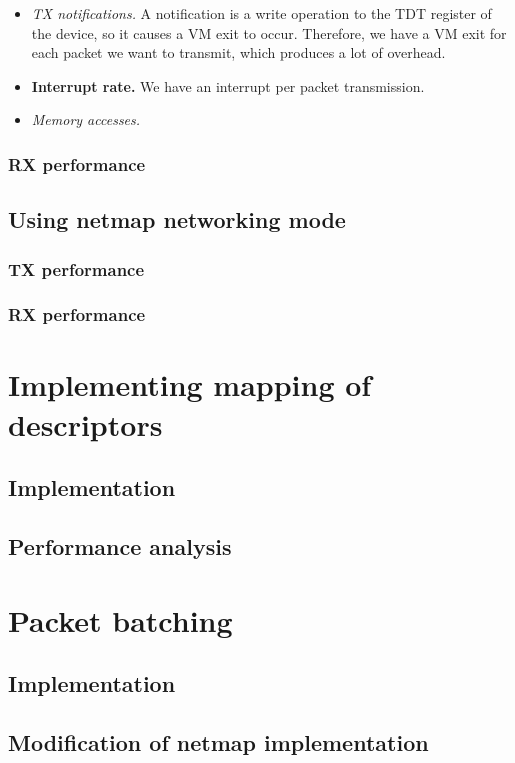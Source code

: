 \documentclass[a4paper, 12pt, titlepage]{report}
\begin{document}
\begin{itemize}
\item \textit{TX notifications.} A notification is a write operation to the TDT register of the device, so it causes a VM exit to occur. Therefore, we have a VM exit for each packet we want to transmit, which produces a lot of overhead.
\item \textbf{Interrupt rate.} We have an interrupt per packet transmission. 
\item \textit{Memory accesses.}
\end{itemize}
\subsubsection{RX performance}

\subsection{Using netmap networking mode} \label{subsec:using_netmap_mode}

\subsubsection{TX performance}

\subsubsection{RX performance}
\section{Implementing mapping of descriptors} \label{subsec:memmap}
\subsection{Implementation}
\subsection{Performance analysis}
\section{Packet batching} \label{sec:packet_batching}
\subsection{Implementation}
\subsection{Modification of netmap implementation}
\end{document}
